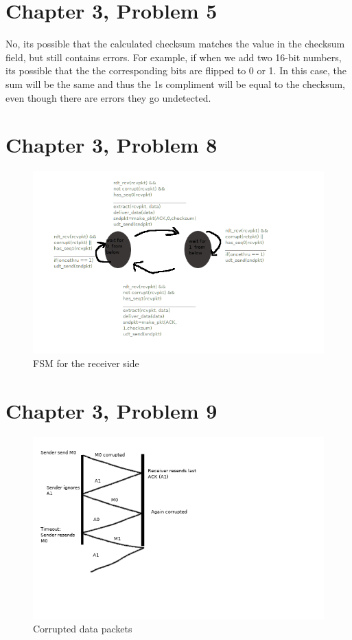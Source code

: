 \documentclass{article}
\begin{document}
\section*{Chapter 3, Problem 5}
No, its possible that the  calculated checksum matches the value in the checksum field, but still contains errors.  For example, if when we add two 16-bit numbers, its possible that the the corresponding bits are flipped to 0 or 1.  In this case, the sum will be the same and thus the 1s compliment will be equal to the checksum, even though there are errors they go undetected.\\

\section*{Chapter 3, Problem 8}
\begin{figure}[h!]
\centering
\includegraphics[scale=0.45]{P8.png}
\caption{FSM for the receiver side}
\end{figure}
\clearpage

\section*{Chapter 3, Problem 9}
\begin{figure}[h!]
\centering
\includegraphics[scale=0.5]{P9a.png}
\caption{Corrupted data packets}
\end{figure}
\end{document}
